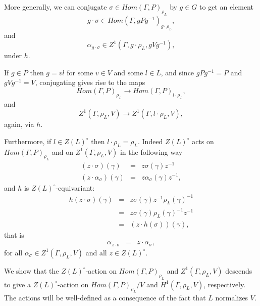 More generally, we can conjugate $\sigma\in Hom(\Gamma, P)_{\rho_L}$ by $g \in G$ to get an element 
\begin{displaymath}
  g \cdot \sigma \in Hom(\Gamma, gPg^{-1})_{g\cdot\rho_L},
\end{displaymath}
and
\begin{displaymath}
  \alpha_{g \cdot \sigma} \in Z^1(\Gamma, g\cdot\rho_L, gVg^{-1}),
\end{displaymath}
under $h$.

If $g\in P$ then $g=vl$ for some $v\in V$ and some $l\in L$, and since $gPg^{-1} = P$ and $gVg^{-1} = V$, conjugating gives rise to the maps
\begin{displaymath}
  Hom(\Gamma, P)_{\rho_L} \rightarrow Hom(\Gamma, P)_{l\cdot\rho_L},
\end{displaymath}
and
\begin{displaymath}
  Z^1(\Gamma, \rho_L, V)\rightarrow Z^1(\Gamma, l\cdot\rho_L, V),
\end{displaymath}
again, via $h$.

Furthermore, if $l\in Z(L)^\circ$ then $l\cdot\rho_L = \rho_L$. Indeed $Z(L)^\circ$ acts on $Hom(\Gamma, P)_{\rho_L}$ and on $Z^1(\Gamma, \rho_L, V)$ in the following way
\begin{eqnarray*}
  (z \cdot \sigma) (\gamma) &=& z \sigma(\gamma) z^{-1} \\
  (z \cdot \alpha_\sigma) (\gamma) &=&  z \alpha_\sigma(\gamma) z^{-1},
\end{eqnarray*}
and $h$ is $Z(L)^\circ$-equivariant:
\begin{eqnarray*}
  h(z \cdot \sigma)(\gamma) &=&  z \sigma(\gamma) z^{-1} \rho_L(\gamma)^{-1} \\
  &=& z \sigma(\gamma) \rho_L(\gamma)^{-1} z^{-1} \\
  &=& (z \cdot h(\sigma))(\gamma),
\end{eqnarray*}
that is
\begin{eqnarray}
  \alpha_{z \cdot \sigma} &=& z \cdot \alpha_\sigma,
  \label{eqn:h_z_equivar}
\end{eqnarray}
for all $\alpha_\sigma \in Z^1(\Gamma, \rho_L, V)$ and all $z \in Z(L)^\circ$.

We show that the $Z(L)^\circ$-action on $Hom(\Gamma, P)_{\rho_L}$ and $Z^1(\Gamma, \rho_L, V)$ descends to give a $Z(L)^\circ$-action on $Hom(\Gamma, P)_{\rho_L}/V$ and $H^1(\Gamma, \rho_L, V)$, respectively. The actions will be well-defined as a consequence of the fact that $L$ normalizes $V$.


